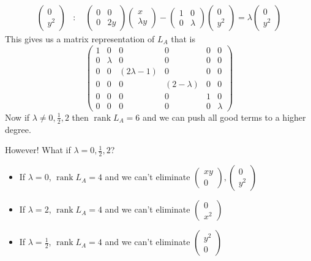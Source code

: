 \documentclass{article}
\begin{document}
\begin{align*}
\begin{pmatrix} 0 \\ y^2 \end{pmatrix}&: \quad
\begin{pmatrix} 0 & 0 \\ 0 & 2y \end{pmatrix}
\begin{pmatrix} x \\ \lambda y \end{pmatrix}
-
\begin{pmatrix} 1 & 0 \\ 0 & \lambda \end{pmatrix}
\begin{pmatrix} 0 \\ y^2 \end{pmatrix}
= \lambda \begin{pmatrix} 0 \\ y^2 \end{pmatrix}
\end{align*}
This gives us a matrix representation of $L_A$ that is 
\[
\begin{pmatrix}
    1 & 0 & 0 & 0 & 0 & 0 \\
    0 & \lambda & 0 & 0 & 0 & 0 \\
    0 & 0 & (2\lambda-1) & 0 & 0 & 0 \\
    0 & 0 & 0 & (2-\lambda) & 0 & 0 \\
    0 & 0 & 0 & 0 & 1 & 0 \\
    0 & 0 & 0 & 0 & 0 & \lambda
\end{pmatrix}
\]
Now if $\lambda\neq0,\frac{1}{2},2$ then $\operatorname{rank}L_A=6$ and we can push all good terms to a higher degree.

However! What if  $\lambda = 0,\frac{1}{2},2$?
\begin{itemize}
    \item If $\lambda=0$, $\operatorname{rank}L_A=4$ and we can't eliminate $\begin{pmatrix}
xy\\ 0
\end{pmatrix},\begin{pmatrix}
0\\ y^2
\end{pmatrix}$
    \item If $\lambda=2$, $\operatorname{rank}L_A=4$ and we can't eliminate $\begin{pmatrix}
0\\ x^2
\end{pmatrix}$
    \item If $\lambda=\frac{1}{2}$, $\operatorname{rank}L_A=4$ and we can't eliminate $\begin{pmatrix}
y^2\\ 0
\end{pmatrix}$
\end{itemize}
\end{document}

